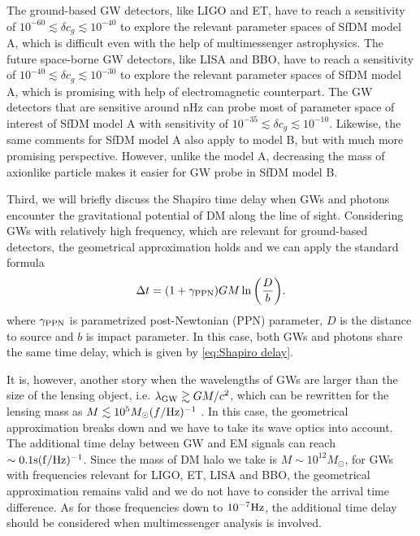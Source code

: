 \documentclass[aps,prd,twocolumn,10pt,groupedaddress]{revtex4-1}
\begin{document}
The ground-based GW detectors, like LIGO and ET, have to reach a sensitivity of $10^{-60}\lesssim\delta c_g\lesssim10^{-40}$ to explore the relevant parameter spaces of SfDM model A, which is difficult even with the help of multimessenger astrophysics. The future space-borne GW detectors, like LISA and BBO, have to reach a sensitivity of $10^{-40}\lesssim\delta c_g\lesssim10^{-30}$ to explore the relevant parameter spaces of SfDM model A, which is promising with help of electromagnetic counterpart. The GW detectors that are sensitive around nHz can probe most of parameter space of interest of SfDM model A with sensitivity of $10^{-35}\lesssim\delta c_g\lesssim10^{-10}$. Likewise, the same comments for SfDM model A also apply to model B, but with much more promising perspective. However, unlike the model A, decreasing the mass of axionlike particle makes it easier for GW probe in SfDM model B.

Third, we will briefly discuss the Shapiro time delay \cite{Shapiro:1964uw} when GWs and photons encounter the gravitational potential of DM along the line of sight. Considering GWs with relatively high frequency, which are relevant for ground-based detectors, the geometrical approximation holds and we can apply the standard formula
\begin{align}\label{eq:Shapiro delay}
\Delta t=(1+\gamma_{\rm PPN})GM\ln\bigg(\frac{D}{b}\bigg).
\end{align}
where $\gamma_{\rm PPN}$ is parametrized post-Newtonian (PPN) parameter, $D$ is the distance to source and $b$ is impact parameter. In this case, both GWs and photons share the same time delay, which is given by \eqref{eq:Shapiro delay}.

It is, however, another story when the wavelengths of GWs are larger than the size of the lensing object, i.e. $\lambda_{\rm GW}\gtrsim GM/c^{2}$, which can be rewritten for the lensing mass as $M\lesssim 10^{5}M_{\odot}(f/\rm Hz)^{-1}$ \cite{Kahya:2016prx, Takahashi:2016jom}. In this case, the geometrical approximation breaks down and we have to take its wave optics into account. The additional time delay between GW and EM signals can reach $\sim 0.1 \rm s (f/\rm Hz)^{-1}$. Since the mass of DM halo we take is $M\sim 10^{12}M_{\odot}$, for GWs with frequencies relevant for LIGO, ET, LISA and BBO, the geometrical approximation remains valid and we do not have to consider the arrival time difference. As for those frequencies down to $10^{-7}\rm Hz$, the additional time delay should be considered when multimessenger analysis is involved.
\end{document}
